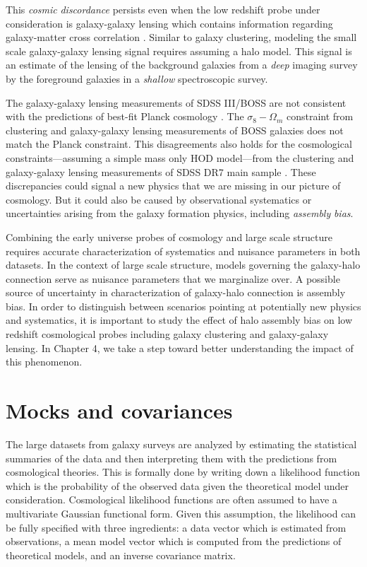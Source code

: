 This \emph{cosmic} \emph{discordance} persists even when the low redshift probe under consideration is galaxy-galaxy lensing which contains information regarding galaxy-matter cross correlation \citep{mandel2013,more15,lensingislow}. Similar to galaxy clustering, modeling the small scale galaxy-galaxy lensing signal requires assuming a halo model. 
This signal is an estimate of the lensing of the background galaxies from a \emph{deep} imaging survey by the foreground galaxies in a \emph{shallow} spectroscopic survey.

The galaxy-galaxy lensing measurements of SDSS III/BOSS \citep{miyatake15,lensingislow} are not consistent with the predictions of best-fit Planck cosmology \citep{planckII}.
The $\sigma_{8}-\Omega_{m}$ constraint from clustering and galaxy-galaxy lensing measurements of BOSS galaxies \citep{more15} does not match the Planck constraint.
This disagreements also holds for the cosmological constraints---assuming a simple mass only HOD model---from the clustering and galaxy-galaxy lensing measurements of SDSS DR7 main sample \citep{cacciato13}. These discrepancies could signal a new physics that we are missing in our picture of cosmology. But it could also be caused by observational systematics or uncertainties arising from the galaxy formation physics, including \emph{assembly} \emph{bias}.

Combining the early universe probes of cosmology and large scale structure requires accurate 
characterization of systematics and nuisance parameters in both datasets. In the context of large scale 
structure, models governing the galaxy-halo connection serve as nuisance parameters that we marginalize over. A possible source of uncertainty in characterization of galaxy-halo connection is assembly bias. In order to distinguish between scenarios pointing at potentially new physics and systematics, it is important to study the effect of halo assembly bias on low redshift cosmological probes including galaxy clustering and galaxy-galaxy lensing. In Chapter 4, we take a step toward better understanding the impact of this phenomenon. 

\section{Mocks and covariances}

The large datasets from galaxy surveys are analyzed by estimating the statistical summaries of the 
data and then interpreting them with the predictions from cosmological theories. This is formally done 
by writing down a likelihood function which is the probability of the observed data given the theoretical model under 
consideration. Cosmological likelihood functions are often assumed to have a multivariate Gaussian 
functional form. Given this assumption, the likelihood can be fully specified with three ingredients: a data vector which is estimated from observations, a mean model vector 
which is computed from the predictions of theoretical models, and an inverse covariance matrix. 

